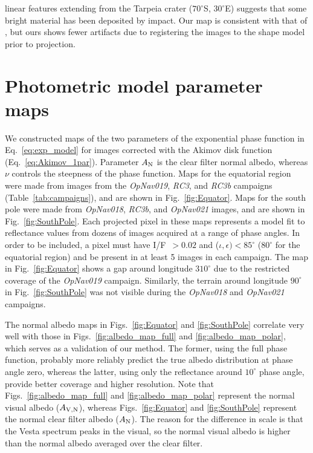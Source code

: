 \documentclass[3p,authoryear]{elsarticle}
\begin{document}
linear features extending from the Tarpeia crater ($70^\circ$S, $30^\circ$E) suggests that some bright material has been deposited by impact. Our map is consistent with that of \citet{L13}, but ours shows fewer artifacts due to registering the images to the shape model prior to projection.


\section{Photometric model parameter maps}
\label{sec:parameter_maps}

We constructed maps of the two parameters of the exponential phase function in Eq.~\ref{eq:exp_model} for images corrected with the Akimov disk function (Eq.~\ref{eq:Akimov_1par}). Parameter $A_{\rm N}$ is the clear filter normal albedo, whereas $\nu$ controls the steepness of the phase function. Maps for the equatorial region were made from images from the {\it OpNav019}, {\it RC3}, and {\it RC3b} campaigns (Table~\ref{tab:campaigns}), and are shown in Fig.~\ref{fig:Equator}. Maps for the south pole were made from {\it OpNav018}, {\it RC3b}, and {\it OpNav021} images, and are shown in Fig.~\ref{fig:SouthPole}. Each projected pixel in these maps represents a model fit to reflectance values from dozens of images acquired at a range of phase angles. In order to be included, a pixel must have I/F~$> 0.02$ and ($\iota, \epsilon) < 85^\circ$ ($80^\circ$ for the equatorial region) and be present in at least 5 images in each campaign. The map in Fig.~\ref{fig:Equator} shows a gap around longitude $310^\circ$ due to the restricted coverage of the {\it OpNav019} campaign. Similarly, the terrain around longitude $90^\circ$ in Fig.~\ref{fig:SouthPole} was not visible during the {\it OpNav018} and {\it OpNav021} campaigns.

The normal albedo maps in Figs.~\ref{fig:Equator} and \ref{fig:SouthPole} correlate very well with those in Figs.~\ref{fig:albedo_map_full} and \ref{fig:albedo_map_polar}, which serves as a validation of our method. The former, using the full phase function, probably more reliably predict the true albedo distribution at phase angle zero, whereas the latter, using only the reflectance around $10^\circ$ phase angle, provide better coverage and higher resolution. Note that Figs.~\ref{fig:albedo_map_full} and \ref{fig:albedo_map_polar} represent the normal visual albedo ($A_{\rm V,N}$), whereas Figs.~\ref{fig:Equator} and \ref{fig:SouthPole} represent the normal clear filter albedo ($A_{\rm N}$). The reason for the difference in scale is that the Vesta spectrum peaks in the visual, so the normal visual albedo is higher than the normal albedo averaged over the clear filter.
\end{document}
